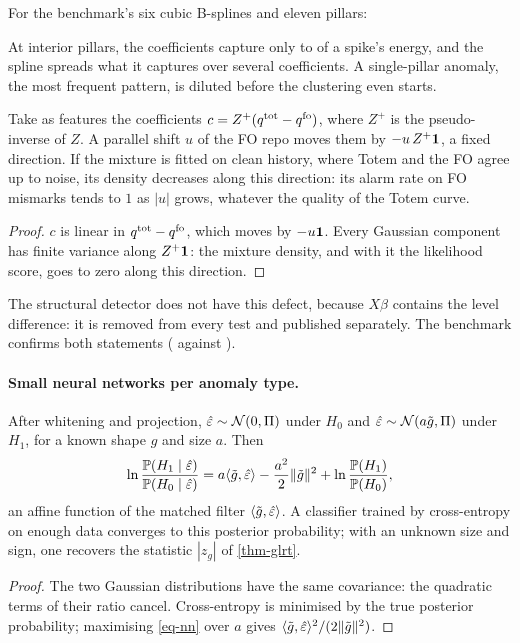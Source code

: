 For the benchmark's six cubic B-splines and eleven pillars:
\begin{center}\end{center}
At interior pillars, the coefficients capture only \vLevMin{} to \vLevMax{} of a spike's energy, and the spline spreads
what it captures over several coefficients. A single-pillar anomaly, the most frequent pattern, is diluted before the
clustering even starts.

\begin{proposition}\label{prop-gmm-fo}
Take as features the coefficients $c=Z^+(q^{\mathrm{tot}}-q^{\mathrm{fo}})$, where $Z^+$ is the pseudo-inverse of $Z$. A parallel shift
$u$ of the FO repo moves them by $-u\,Z^+\mathbf{1}$, a fixed direction. If the mixture is fitted on clean history, where
Totem and the FO agree up to noise, its density decreases along this direction: its alarm rate on FO mismarks tends to
$1$ as $|u|$ grows, whatever the quality of the Totem curve.
\end{proposition}
\begin{proof}
$c$ is linear in $q^{\mathrm{tot}}-q^{\mathrm{fo}}$, which moves by $-u\mathbf{1}$. Every Gaussian component has finite variance along
$Z^+\mathbf{1}$: the mixture density, and with it the likelihood score, goes to zero along this direction.
\end{proof}
The structural detector does not have this defect, because $X\beta$ contains the level difference: it is removed from
every test and published separately. The benchmark confirms both statements (\vFoGmmDiff{} against \vFoStruct).

\paragraph{Small neural networks per anomaly type.}
\begin{proposition}\label{prop-nn}
After whitening and projection, $\hat\varepsilon\sim\mathcal{N}(0, \Pi)$ under $H_0$ and $\hat\varepsilon\sim\mathcal{N}(a\tilde g, \Pi)$ under $H_1$, for a known shape
$g$ and size $a$. Then
\begin{equation}\label{eq-nn}
\ln\frac{\mathbb P(H_1\mid\hat\varepsilon)}{\mathbb P(H_0\mid\hat\varepsilon)}=a\langle \tilde g, \hat\varepsilon\rangle-\frac{a^2}{2}\lVert \tilde g\rVert^2
+\ln\frac{\mathbb P(H_1)}{\mathbb P(H_0)},
\end{equation}
an affine function of the matched filter $\langle \tilde g, \hat\varepsilon\rangle$. A classifier trained by cross-entropy on enough data
converges to this posterior probability; with an unknown size and sign, one recovers the statistic $|z_g|$ of
\cref{thm-glrt}.
\end{proposition}
\begin{proof}
The two Gaussian distributions have the same covariance: the quadratic terms of their ratio cancel. Cross-entropy is
minimised by the true posterior probability; maximising \eqref{eq-nn} over $a$ gives $\langle \tilde g, \hat\varepsilon\rangle^2/(2\lVert \tilde g\rVert^2)$.
\end{proof}

